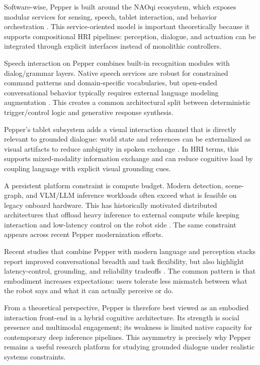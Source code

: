   Software-wise, Pepper is built around the NAOqi ecosystem, which exposes modular services for sensing, speech, tablet interaction, and behavior orchestration \cite{softbank_python_sdk_2026}. This
  service-oriented model is important theoretically because it supports compositional HRI pipelines: perception, dialogue, and actuation can be integrated through explicit interfaces instead of
  monolithic controllers.

  Speech interaction on Pepper combines built-in recognition modules with dialog/grammar layers. Native speech services are robust for constrained command patterns and domain-specific vocabularies, but
  open-ended conversational behavior typically requires external language modeling augmentation \cite{softbank_alspeechrecognition_2026}. This creates a common architectural split between deterministic
  trigger/control logic and generative response synthesis.

  Pepper’s tablet subsystem adds a visual interaction channel that is directly relevant to grounded dialogue: world state and references can be externalized as visual artifacts to reduce ambiguity in
  spoken exchange \cite{softbank_peppers_tablet_2026}. In HRI terms, this supports mixed-modality information exchange and can reduce cognitive load by coupling language with explicit visual grounding
  cues.

  A persistent platform constraint is compute budget. Modern detection, scene-graph, and VLM/LLM inference workloads often exceed what is feasible on legacy onboard hardware. This has historically
  motivated distributed architectures that offload heavy inference to external compute while keeping interaction and low-latency control on the robot side \cite{reyes_near_2018,trinquet_future_2025}. The
  same constraint appears across recent Pepper modernization efforts.

  Recent studies that combine Pepper with modern language and perception stacks report improved conversational breadth and task flexibility, but also highlight latency-control, grounding, and reliability
  tradeoffs \cite{brad_retrieval-augmented_2025}. The common pattern is that embodiment increases expectations: users tolerate less mismatch between what the robot says and what it can actually perceive
  or do.

  From a theoretical perspective, Pepper is therefore best viewed as an embodied interaction front-end in a hybrid cognitive architecture. Its strength is social presence and multimodal engagement; its
  weakness is limited native capacity for contemporary deep inference pipelines. This asymmetry is precisely why Pepper remains a useful research platform for studying grounded dialogue under realistic
  systems constraints.

